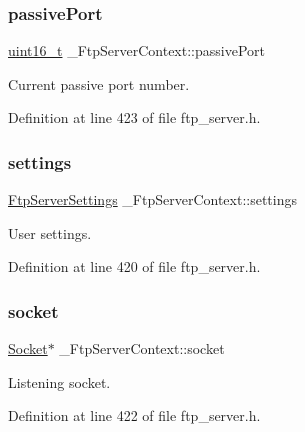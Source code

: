 \subsubsection{\texorpdfstring{passive\+Port}{passivePort}}
{\footnotesize\ttfamily \hyperlink{stdint_8h_a273cf69d639a59973b6019625df33e30}{uint16\+\_\+t} \+\_\+\+Ftp\+Server\+Context\+::passive\+Port}



Current passive port number. 



Definition at line 423 of file ftp\+\_\+server.\+h.

\mbox{\label{struct__FtpServerContext_a5c9364e9bdda94c7a36e8df7488153ae}} 
\subsubsection{\texorpdfstring{settings}{settings}}
{\footnotesize\ttfamily \hyperlink{structFtpServerSettings}{Ftp\+Server\+Settings} \+\_\+\+Ftp\+Server\+Context\+::settings}



User settings. 



Definition at line 420 of file ftp\+\_\+server.\+h.

\mbox{\label{struct__FtpServerContext_a3fdee8fbe65cba5662f79f2ef2c45d82}} 
\subsubsection{\texorpdfstring{socket}{socket}}
{\footnotesize\ttfamily \hyperlink{socket_8h_aa85acfb0fa336ef495e6ba87fb88fc48}{Socket}$\ast$ \+\_\+\+Ftp\+Server\+Context\+::socket}



Listening socket. 



Definition at line 422 of file ftp\+\_\+server.\+h.

\mbox{\label{struct__FtpServerContext_abec43eaa55176ebb6a7e5113098e8598}} 
